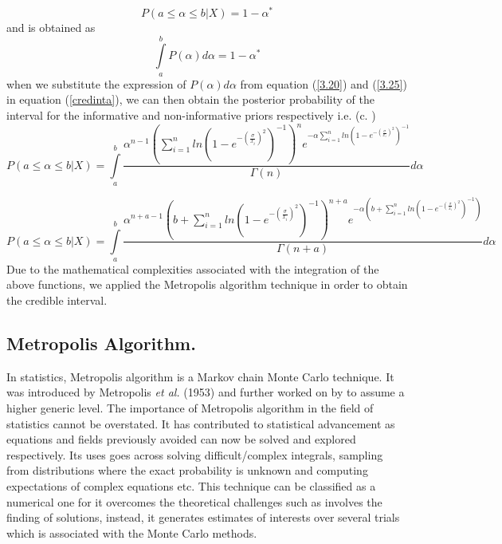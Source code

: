 \documentclass[a4paper,12pt]{report}
\newcommand{\para}{\hspace{0.5cm}}
\begin{document}
\begin{equation}\label{crd1a}
P(a\le\alpha\le b|X)=1-\alpha^*	
\end{equation}
\noindent and is obtained as
\begin{equation}\label{credinta}
\int\limits_{a}^{b}P(\alpha)d\alpha=1-\alpha^*
\end{equation}
\noindent when we substitute the expression of $P(\alpha)d\alpha$ from equation (\ref{3.20}) and (\ref{3.25}) in equation (\ref{credinta}), we can then obtain the posterior probability of the interval for the informative and non-informative priors respectively i.e. (c. \citep{BAEBMFDA})
\begin{equation}\label{credintajeffery}
P(a\le\alpha\le b|X)=\int\limits_a^b \frac{\alpha^{n-1}\left(\sum\limits_{ i=1 }^{n}ln\left(1-e^{-\left(\frac{\sigma}{x_i}\right)^2}\right)^{-1}\right)^n e^{-\alpha\sum\limits_{ i=1 }^{n}ln\left(1-e^{-\left(\frac{\sigma}{x_i}\right)^2}\right)^{-1}}}{\Gamma(n)}d\alpha
\end{equation}

\begin{equation}\label{creditagamma}
P(a\le\alpha\le b|X)=\int\limits_a^b\frac{\alpha^{n+a-1}\left(b+\sum\limits_{ i=1 }^{n}ln\left(1-e^{-\left(\frac{\sigma}{x_i}\right)^2}\right)^{-1}\right)^{n+a}e^{-\alpha\left(b+\sum\limits_{ i=1 }^{n}ln\left(1-e^{-\left(\frac{\sigma}{x_i}\right)^2}\right)^{-1}\right)}} {\Gamma(n+a)}d\alpha
\end{equation}
Due to the mathematical complexities associated with the integration of the above functions, we applied the Metropolis algorithm technique in order to obtain the credible interval.
\subsection{Metropolis Algorithm.}
\noindent\para In statistics, Metropolis algorithm is a Markov chain Monte Carlo technique. It was introduced by Metropolis \textit{et al.} (1953) and further worked on by \cite{hastings} to assume a higher generic level. The importance of Metropolis algorithm in the field of statistics cannot be overstated. It has contributed to statistical advancement as equations and fields previously avoided can now be solved and explored respectively. Its uses goes across solving difficult/complex integrals, sampling from distributions where the exact probability is unknown and computing expectations of complex equations etc. This technique can be classified as a numerical one for it overcomes the theoretical challenges such as involves the finding of solutions, instead, it generates estimates of interests over several trials which is associated with the Monte Carlo methods.
\end{document}
